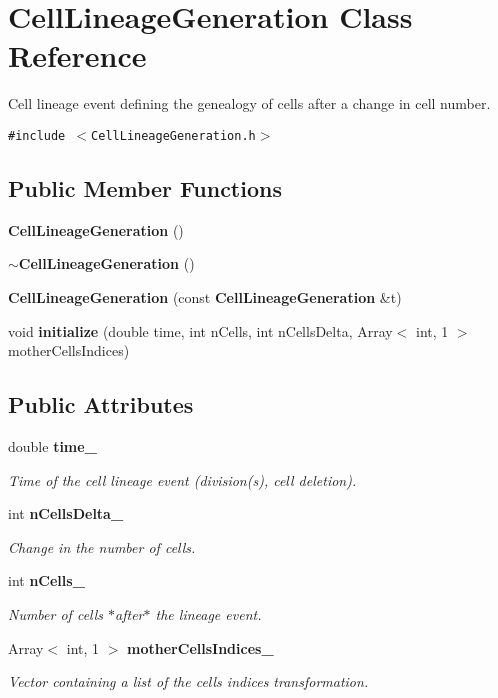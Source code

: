 \section{CellLineageGeneration Class Reference}
\label{classCellLineageGeneration}
Cell lineage event defining the genealogy of cells after a change in cell number.  


{\tt \#include $<$CellLineageGeneration.h$>$}

\subsection*{Public Member Functions}
\begin{CompactItemize}
\item 
{\bf CellLineageGeneration} ()
\item 
{\bf $\sim$CellLineageGeneration} ()
\item 
{\bf CellLineageGeneration} (const {\bf CellLineageGeneration} \&t)
\item 
void {\bf initialize} (double time, int nCells, int nCellsDelta, Array$<$ int, 1 $>$ motherCellsIndices)
\end{CompactItemize}
\subsection*{Public Attributes}
\begin{CompactItemize}
\item 
double {\bf time\_\-}
\begin{CompactList}\small\item\em Time of the cell lineage event (division(s), cell deletion). \item\end{CompactList}\item 
int {\bf nCellsDelta\_\-}
\begin{CompactList}\small\item\em Change in the number of cells. \item\end{CompactList}\item 
int {\bf nCells\_\-}
\begin{CompactList}\small\item\em Number of cells $\ast$after$\ast$ the lineage event. \item\end{CompactList}\item 
Array$<$ int, 1 $>$ {\bf motherCellsIndices\_\-}
\begin{CompactList}\small\item\em Vector containing a list of the cells indices transformation. \item\end{CompactList}\end{CompactItemize}


